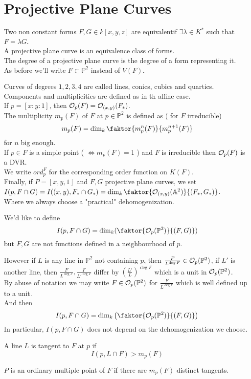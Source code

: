 \documentclass[../main.tex]{subfiles}
\begin{document}
\section{Projective Plane Curves}
\begin{defn}
	Two non constant forms $F,G\in k[x,y,z]$ are equivalentif $\exists \lambda \in K^{\ast}$ such that $F= \lambda G$.\\
	A projective plane curve is an equivalence class of forms.\\
	The degree of a projective plane curve is the degree of a form representing it.\\
	As before we'll write $F \subset \mathbb{P}^{2}$ instead of $V( F) $.
\end{defn}
Curves of degrees $1,2,3,4$ are called lines, conics, cubics and quartics.\\
Components and multiplicities are defined as in th affine case.\\
If $p= [ x:y:1]$, then $\mathcal{O}_p( F) = \mathcal{O}_{( x,y) } ( F_\ast) $.\\
The multiplicity $m_p( F) $ of $F$ at $p\in \mathbb{P}^{2}$ is defined as ( for $F$ irreducible) 
\[ 
m_p( F) = \dim_k \faktor{m_p^{n}( F) }{m_p^{n+1}( F) }
\]
for $n $ big enough.\\
If $p\in F$ is a simple point ( $\iff m_p( F) =1$ ) and $F$ is irreducible then $\mathcal{O}_p( F) $ is a DVR.\\
We write $ord_p^{F}$ for the corresponding order function on $K(F ) $.\\
Finally, if $P= [ x,y,1] $ and $F,G$ projective plane curves, we set $I( p,F\cap G) = I( ( x,y), F_\ast\cap G_\ast )= \dim_k \faktor{\O_{( x,y) }( \mathbb{A}^{2})  }{ ( F_\ast,G_\ast) } $.\\
Where we always choose a "practical" dehomogenization.
\begin{rmq}
We'd like to define
\[ 
I( p,F\cap G) = \dim_k (  \faktor{\O_p( \mathbb{P}^{2}) }{( F,G) }) 
\]
but $F,G$ are not functions defined in a neighbourhood of $p$.
\end{rmq}
However if $L$ is any line in $\mathbb{P}^{2}$ not containing $p$, then $ \frac{F}{L^{\deg F}}\in \mathcal{O}_p( \mathbb{P}^{2}) $, if $L'$ is another line, then $ \frac{F}{L^{\deg F}}, \frac{F}{L'^{\deg F}}$ differ by $ ( \frac{L'}{L})^{\deg F} $ which is a unit in $\mathcal{O}_p( \mathbb{P}^{2}) $.\\
By abuse of notation we may write $F\in \mathcal{O}_p( \mathbb{P}^{2}) $ for $\frac{F}{L^{\deg F}}$ which is well defined up to a unit.\\
And then
\[ 
I( p,F\cap G) = \dim_k \left( \faktor{\O_p( \mathbb{P}^{2}) }{( F,G) }\right) 
\]
In particular, $I( p,F\cap G) $ does not depend on the dehomogenization we choose.
\begin{defn}
	A line $L$ is tangent to $F$ at $p$ if
	\[ 
	I( p,L\cap F) > m_p( F) 
	\]
\end{defn}
$P$ is an ordinary multiple point of $F$ if there are $m_p( F) $ distinct tangents.
\end{document}
